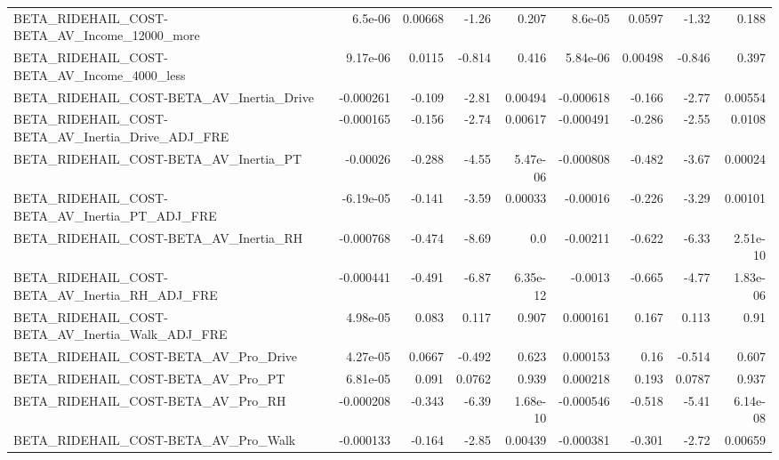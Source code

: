 \begin{tabular}{lrrrrrrrr}
BETA\_RIDEHAIL\_COST-BETA\_AV\_Income\_12000\_more       &     6.5e-06 &      0.00668 &    -1.26 &    0.207 &    8.6e-05 &      0.0597 &        -1.32 &         0.188 \\
BETA\_RIDEHAIL\_COST-BETA\_AV\_Income\_4000\_less        &    9.17e-06 &       0.0115 &   -0.814 &    0.416 &   5.84e-06 &     0.00498 &       -0.846 &         0.397 \\
BETA\_RIDEHAIL\_COST-BETA\_AV\_Inertia\_Drive           &   -0.000261 &       -0.109 &    -2.81 &  0.00494 &  -0.000618 &      -0.166 &        -2.77 &       0.00554 \\
BETA\_RIDEHAIL\_COST-BETA\_AV\_Inertia\_Drive\_ADJ\_FRE   &   -0.000165 &       -0.156 &    -2.74 &  0.00617 &  -0.000491 &      -0.286 &        -2.55 &        0.0108 \\
BETA\_RIDEHAIL\_COST-BETA\_AV\_Inertia\_PT              &    -0.00026 &       -0.288 &    -4.55 & 5.47e-06 &  -0.000808 &      -0.482 &        -3.67 &       0.00024 \\
BETA\_RIDEHAIL\_COST-BETA\_AV\_Inertia\_PT\_ADJ\_FRE      &   -6.19e-05 &       -0.141 &    -3.59 &  0.00033 &   -0.00016 &      -0.226 &        -3.29 &       0.00101 \\
BETA\_RIDEHAIL\_COST-BETA\_AV\_Inertia\_RH              &   -0.000768 &       -0.474 &    -8.69 &      0.0 &   -0.00211 &      -0.622 &        -6.33 &      2.51e-10 \\
BETA\_RIDEHAIL\_COST-BETA\_AV\_Inertia\_RH\_ADJ\_FRE      &   -0.000441 &       -0.491 &    -6.87 & 6.35e-12 &    -0.0013 &      -0.665 &        -4.77 &      1.83e-06 \\
BETA\_RIDEHAIL\_COST-BETA\_AV\_Inertia\_Walk\_ADJ\_FRE    &    4.98e-05 &        0.083 &    0.117 &    0.907 &   0.000161 &       0.167 &        0.113 &          0.91 \\
BETA\_RIDEHAIL\_COST-BETA\_AV\_Pro\_Drive               &    4.27e-05 &       0.0667 &   -0.492 &    0.623 &   0.000153 &        0.16 &       -0.514 &         0.607 \\
BETA\_RIDEHAIL\_COST-BETA\_AV\_Pro\_PT                  &    6.81e-05 &        0.091 &   0.0762 &    0.939 &   0.000218 &       0.193 &       0.0787 &         0.937 \\
BETA\_RIDEHAIL\_COST-BETA\_AV\_Pro\_RH                  &   -0.000208 &       -0.343 &    -6.39 & 1.68e-10 &  -0.000546 &      -0.518 &        -5.41 &      6.14e-08 \\
BETA\_RIDEHAIL\_COST-BETA\_AV\_Pro\_Walk                &   -0.000133 &       -0.164 &    -2.85 &  0.00439 &  -0.000381 &      -0.301 &        -2.72 &       0.00659 \\

\end{tabular}
